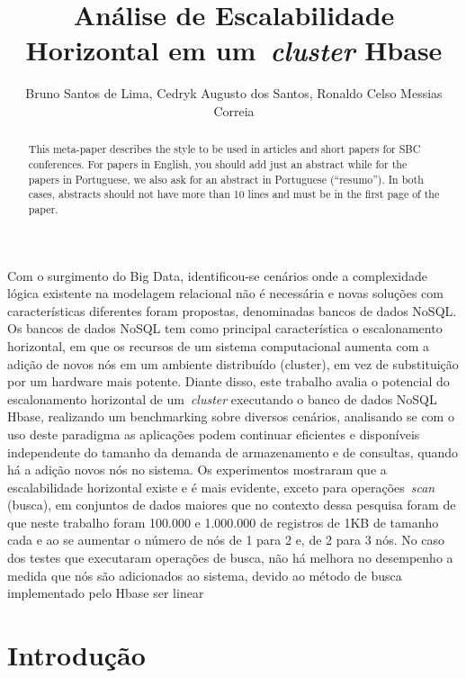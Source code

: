 \documentclass[12pt]{article}
\title{Análise de Escalabilidade Horizontal em um~\emph{cluster}  Hbase}
\author{Bruno Santos de Lima, Cedryk Augusto dos Santos, Ronaldo Celso Messias Correia }
\begin{document}
 

\maketitle


\begin{abstract}
  This meta-paper describes the style to be used in articles and short papers
  for SBC conferences. For papers in English, you should add just an abstract
  while for the papers in Portuguese, we also ask for an abstract in
  Portuguese (``resumo''). In both cases, abstracts should not have more than
  10 lines and must be in the first page of the paper.
\end{abstract}
     
\begin{resumo} 
Com o surgimento do Big Data, identificou-se cenários onde a complexidade lógica existente na modelagem relacional não é necessária e novas soluções com características diferentes foram propostas, denominadas bancos de dados NoSQL. Os bancos de dados NoSQL tem como principal característica o escalonamento horizontal, em que os recursos de um sistema computacional aumenta com a adição de novos nós em um ambiente distribuído (cluster), em vez de substituição por um hardware mais potente. Diante disso, este trabalho avalia o potencial do escalonamento horizontal de um~\emph{cluster}  executando o banco de dados NoSQL Hbase, realizando um benchmarking sobre diversos cenários, analisando se com o uso deste paradigma as aplicações podem continuar eficientes e disponíveis independente do tamanho da demanda de armazenamento e de consultas, quando há a adição novos nós no sistema. Os experimentos mostraram que a escalabilidade horizontal existe e é mais evidente, exceto para operações~\emph{scan} (busca), em conjuntos de dados maiores que no contexto dessa pesquisa foram de que neste trabalho foram 100.000 e 1.000.000 de registros de 1KB de tamanho cada e ao se aumentar o número de nós de 1 para 2 e, de 2 para 3 nós. No caso dos testes que executaram operações de busca, não há melhora no desempenho a medida que nós são adicionados ao sistema, devido ao método de busca implementado pelo Hbase ser linear
\end{resumo}


\section{Introdução}
\label{sec:introducao}
\end{document}
